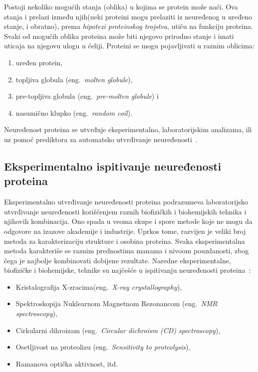 Postoji nekoliko mogućih stanja (oblika) u kojima se protein može naći. Ova stanja i prelazi između njih(neki proteini mogu prelaziti iz neuređenog u uređeno stanje, i obratno), prema {\em hipotezi proteinskog trojstva}, utiču na funkciju proteina. Svaki od mogućih oblika proteina može biti njegovo prirodno stanje i imati uticaja na njegovu ulogu u ćeliji. Proteini se mogu pojavljivati u raznim oblicima:
\begin{enumerate}
\item uređen protein,
\item topljiva globula (eng.~{\em molten globule}),
\item pre-topljiva globula (eng.~{\em pre-molten globule}) i 
\item nasumično klupko (eng.~{\em random coil}).
\end{enumerate}


Neuređenost proteina se utvrđuje eksperimentalno, laboratorijskim analizama, ili uz pomoć prediktora za automatsko utvrđivanje neuređenosti~\cite{JKd,IDP,IDPIDPr,DPC}. 

\subsection{Eksperimentalno ispitivanje neuređenosti proteina}
\label{eksperimentalno}
Eksperimentalno utvrđivanje neuređenosti proteina podrazumeva laboratorijsko utvrđivanje neuređenosti korišćenjem raznih biofizičkih i biohemijskih tehnika i njihovih kombinacija. Ono spada u veoma skupe i spore metode koje ne mogu da odgovore na izazove akademije i industrije. Uprkos tome, razvijen je veliki broj metoda za karakterizaciju strukture i osobina proteina. Svaka eksperimentalna metoda karakteriše se raznim prednostima manama i nivoom pouzdanosti, zbog čega je najbolje kombinovati dobijene rezultate. Naredne eksperimentalne, biofizičke i biohemijske, tehnike su najčešće u ispitivanju neuređenosti proteina~\cite{IDP,JKd}:
\begin{itemize}
\item Kristalografija X-zracima(eng.~{\em X-ray crystallography}),
\item Spektroskopija Nuklearnom Magnetnom Rezonancom (eng.~{\em NMR spectroscopy}),
\item Cirkularni dihroizam (eng.~{\em Circular dichroism (CD) spectroscopy}),
\item Osetljivost na proteolizu (eng.~{\em Sensitivity to proteolysis}),
\item Ramanova optička aktivnost, itd. 
\end{itemize}

